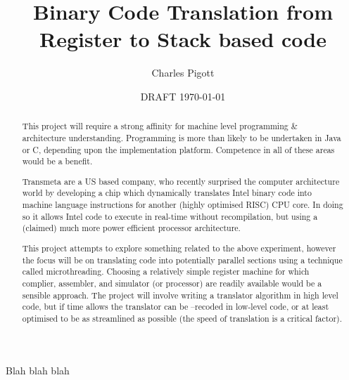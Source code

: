 \documentclass[11pt,a4paper,twoside,notitlepage]{report}
\title{Binary Code Translation from Register to Stack based code}
\author{Charles Pigott}
\date{DRAFT \today}
\begin{document}
\maketitle
\thispagestyle{empty}

\begin{abstract}
	This project will require a strong affinity for machine level programming \&
	architecture understanding. Programming is more than likely to be undertaken
	in Java or C, depending upon the implementation platform. Competence in all
	of these areas would be a benefit.

	Transmeta are a US based company, who recently surprised the computer
	architecture world by developing a chip which dynamically translates Intel
	binary code into machine language instructions for another (highly optimised
	RISC) CPU core.  In doing so it allows Intel code to execute in real-time
	without recompilation, but using a (claimed) much more power efficient
	processor architecture.

	This project attempts to explore something related to the above experiment,
	however the focus will be on translating code into potentially parallel
	sections using a technique called microthreading. Choosing a relatively
	simple register machine for which complier, assembler, and simulator (or
	processor) are readily available would be a sensible approach. The project
	will involve writing a translator algorithm in high level code, but if time
	allows the translator can be –recoded in low-level code, or at least
	optimised to be as streamlined as possible (the speed of translation is a
	critical factor).
\end{abstract}

\listoffigures
\listoftables
\renewcommand*{\lstlistlistingname}{List of Listings}
\lstlistoflistings%

\cleardoublepage%

Blah blah blah\cite{GotoHarmful}

\printbibliography%
\end{document}
